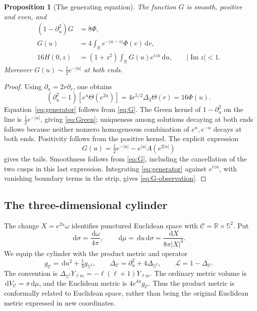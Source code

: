 \documentclass[11pt]{article}
\newtheorem{proposition}{Proposition}[section]
\theoremstyle{remark}
\numberwithin{equation}{section}
\newcommand{\R}{\mathbb R}
\newcommand{\Sph}{\mathbb S^2}
\newcommand{\cC}{\mathcal C}
\newcommand{\cL}{\mathcal L}
\newcommand{\dd}{\,\mathrm d}
\begin{document}
\begin{proposition}[The generating equation]\label{prop:generator}
The function \(G\) is smooth, positive and even, and
\begin{align}
 (1-\partial_u^2)G&=8\Phi,\label{eq:generator}\\
 G(u)&=4\int_{\R}e^{-|u-v|}\Phi(v)\dd v,\label{eq:Green}\\
 16H(0,z)&=(1+z^2)\int_{\R}G(u)e^{izu}\dd u,
 \qquad |\operatorname{Im}z|<1.\label{eq:G-observation}
\end{align}
Moreover \(G(u)\sim\tfrac12e^{-|u|}\) at both ends.
\end{proposition}
\begin{proof}
Using \(\partial_u=2r\partial_r\), one obtains
\[
 (\partial_u^2-1)[e^u\Theta(e^{2u})]
 =4r^{5/2}\Delta_3\Theta(r)=16\Phi(u).
\]
Equation~\eqref{eq:generator} follows from \eqref{eq:G}.
The Green kernel of \(1-\partial_u^2\) on the line is
\(\tfrac12e^{-|u|}\), giving \eqref{eq:Green}; uniqueness among
solutions decaying at both ends follows because neither nonzero
homogeneous combination of \(e^u,e^{-u}\) decays at both ends.
Positivity follows from the positive kernel. The explicit expression
\[
 G(u)=\tfrac12e^{-|u|}-e^{|u|}A(e^{2|u|})
\]
gives the tails. Smoothness follows from \eqref{eq:G}, including the
cancellation of the two cusps in this last expression. Integrating
\eqref{eq:generator} against \(e^{izu}\), with vanishing boundary
terms in the strip, gives \eqref{eq:G-observation}.
\end{proof}

\subsection{The three-dimensional cylinder}

The change \(X=e^{2u}\omega\) identifies punctured Euclidean space
with \(\cC=\R\times\Sph\). Put
\begin{equation}\label{eq:measure}
 \dd\sigma=\frac{\dd\omega}{4\pi},\qquad
 \dd\mu=\dd u\dd\sigma=\frac{\dd X}{8\pi|X|^3}.
\end{equation}
We equip the cylinder with the product metric and operator
\begin{equation}\label{eq:cylinder}
 g_{\cC}=\dd u^2+\tfrac14g_{\Sph},\qquad
 \Delta_{\cC}=\partial_u^2+4\Delta_{\Sph},\qquad
 \cL=1-\Delta_{\cC}.
\end{equation}
The convention is \(\Delta_{\Sph}Y_{\ell m}=-\ell(\ell+1)Y_{\ell m}\).
The ordinary metric volume is \(\dd V_{\cC}=\pi\dd\mu\), and the
Euclidean metric is \(4e^{4u}g_{\cC}\). Thus the product metric is
conformally related to Euclidean space, rather than being the original
Euclidean metric expressed in new coordinates.
\end{document}
